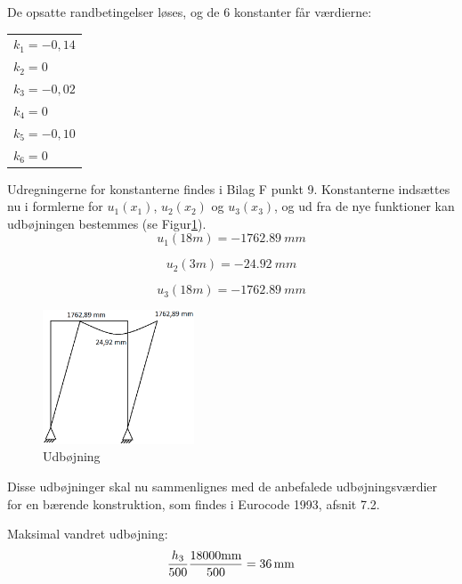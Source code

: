 De opsatte randbetingelser løses, og de 6 konstanter får værdierne: 

\begin{table}[h]
	\begin{tabular}{l}
		$k_1 = -0,\!14$       \\
		$k_2 = 0$             \\
		$k_3 = -0,\!02$       \\
		$k_4 = 0$             \\
		$k_5 = -0,\!10$       \\
		$k_6 = 0$             \\ 
	\end{tabular}
\end{table}

Udregningerne for konstanterne findes i Bilag F punkt 9.
\newline
\newline 
Konstanterne indsættes nu i formlerne for $u_1(x_1)$, $u_2(x_2)$ og $u_3(x_3)$, og ud fra de nye funktioner kan udbøjningen bestemmes (se Figur\ref{fig:udboj}).
\begin{equation}
u_1(18m) = \SI{-1762,89}{mm}
\end{equation}

\begin{equation}
u_2(3m) = \SI{-24,92}{mm}
\end{equation}

\begin{equation}
u_3(18m) = \SI{-1762,89}{mm}
\end{equation}

\begin{figure}[H]
	\centering
	\includegraphics[width=0.4\textwidth]{billeder/udbog.png}
	\caption{Udbøjning}
	\label{fig:udboj}
\end{figure}

Disse udbøjninger skal nu sammenlignes med de anbefalede udbøjningsværdier for en bærende konstruktion, som findes i Eurocode 1993, afsnit 7.2. 

Maksimal vandret udbøjning: 
\begin{equation}
\frac{h_3}{500}
\\
\frac{18000 \text{mm}}{500} = \SI{36}{mm}
\end{equation}

